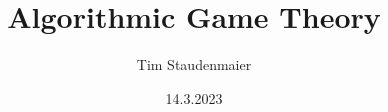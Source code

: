\documentclass[oneside]{ausarbeitung}
\begin{document}

\Seminararbeit

\Informatik

\title{Algorithmic Game Theory}

\author{Tim Staudenmaier}

\examinerIsAProfessortrue   %


\date{14.3.2023}



\maketitle
\cleardoublepage

\setcounter{page}{1}


\makeaffirmation
\cleardoublepage
\end{document}
